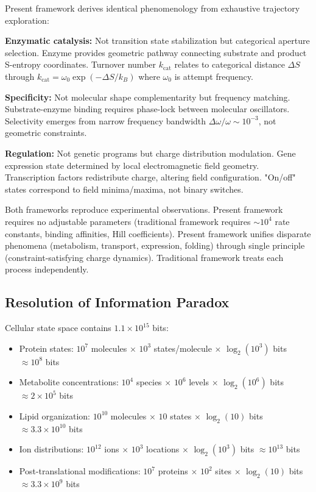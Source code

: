 \documentclass[11pt,a4paper]{article}
\theoremstyle{remark}
\begin{document}
Present framework derives identical phenomenology from exhaustive trajectory exploration:

\textbf{Enzymatic catalysis:} Not transition state stabilization but categorical aperture selection. Enzyme provides geometric pathway connecting substrate and product S-entropy coordinates. Turnover number $k_{\text{cat}}$ relates to categorical distance $\Delta S$ through $k_{\text{cat}} = \omega_0 \exp(-\Delta S/k_B)$ where $\omega_0$ is attempt frequency.

\textbf{Specificity:} Not molecular shape complementarity but frequency matching. Substrate-enzyme binding requires phase-lock between molecular oscillators. Selectivity emerges from narrow frequency bandwidth $\Delta\omega/\omega \sim 10^{-3}$, not geometric constraints.

\textbf{Regulation:} Not genetic programs but charge distribution modulation. Gene expression state determined by local electromagnetic field geometry. Transcription factors redistribute charge, altering field configuration. "On/off" states correspond to field minima/maxima, not binary switches.

Both frameworks reproduce experimental observations. Present framework requires no adjustable parameters (traditional framework requires $\sim 10^4$ rate constants, binding affinities, Hill coefficients). Present framework unifies disparate phenomena (metabolism, transport, expression, folding) through single principle (constraint-satisfying charge dynamics). Traditional framework treats each process independently.

\subsection{Resolution of Information Paradox}

Cellular state space contains $1.1 \times 10^{15}$ bits:
\begin{itemize}
\item Protein states: $10^7$ molecules $\times$ $10^3$ states/molecule $\times$ $\log_2(10^3)$ bits $\approx 10^8$ bits
\item Metabolite concentrations: $10^4$ species $\times$ $10^6$ levels $\times$ $\log_2(10^6)$ bits $\approx 2 \times 10^5$ bits
\item Lipid organization: $10^{10}$ molecules $\times$ $10$ states $\times$ $\log_2(10)$ bits $\approx 3.3 \times 10^{10}$ bits
\item Ion distributions: $10^{12}$ ions $\times$ $10^3$ locations $\times$ $\log_2(10^3)$ bits $\approx 10^{13}$ bits
\item Post-translational modifications: $10^7$ proteins $\times$ $10^2$ sites $\times$ $\log_2(10)$ bits $\approx 3.3 \times 10^9$ bits
\end{itemize}
\end{document}
